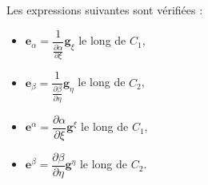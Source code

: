 \begin{proposition}
Les expressions suivantes sont vérifiées :
\begin{itemize}
\item $\mathbf{e}_{\alpha} = \dfrac{1}{\frac{\partial \alpha}{\partial \xi}} \mathbf{g}_{\xi}$ le long de $C_1$,
\item $\mathbf{e}_{\beta} = \dfrac{1}{\frac{\partial \beta}{\partial \eta}} \mathbf{g}_{\eta}$ le long de $C_2$,
\item $\mathbf{e}^{\alpha} = \dfrac{\partial \alpha}{\partial \xi} \mathbf{g}^{\xi}$ le long de $C_1$,
\item $\mathbf{e}^{\beta} = \dfrac{\partial \beta}{\partial \eta} \mathbf{g}^{\eta}$ le long de $C_2$.
\end{itemize}
\label{prop: g_alpha g_beta fct de g_xi g_eta}
\end{proposition}

